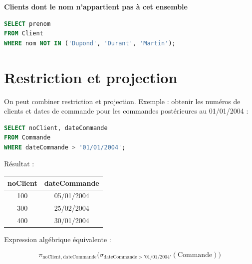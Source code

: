 \textbf{Clients dont le nom n'appartient pas à cet ensemble}

\begin{sqlcodebox}
\begin{lstlisting}[language=SQL]
SELECT prenom
FROM Client
WHERE nom NOT IN ('Dupond', 'Durant', 'Martin');
\end{lstlisting}
\end{sqlcodebox}


\section{Restriction et projection}

On peut combiner restriction et projection.  
Exemple : obtenir les numéros de clients et dates de commande pour les commandes postérieures au 01/01/2004 :

\begin{sqlcodebox}
\begin{lstlisting}[language=SQL]
SELECT noClient, dateCommande
FROM Commande
WHERE dateCommande > '01/01/2004';
\end{lstlisting}
\end{sqlcodebox}

Résultat :

\begin{tabular}{|c|c|}
    \hline
    \textbf{noClient} & \textbf{dateCommande}  \\
    \hline
    100 & 05/01/2004  \\
    300 & 25/02/2004  \\
    400 & 30/01/2004 \\
    \hline
\end{tabular}

Expression algébrique équivalente :

\[
\pi_{\text{noClient},\ \text{dateCommande}}
\bigl(
    \sigma_{\text{dateCommande} > '01/01/2004'}(\text{Commande})
\bigr)
\]



































